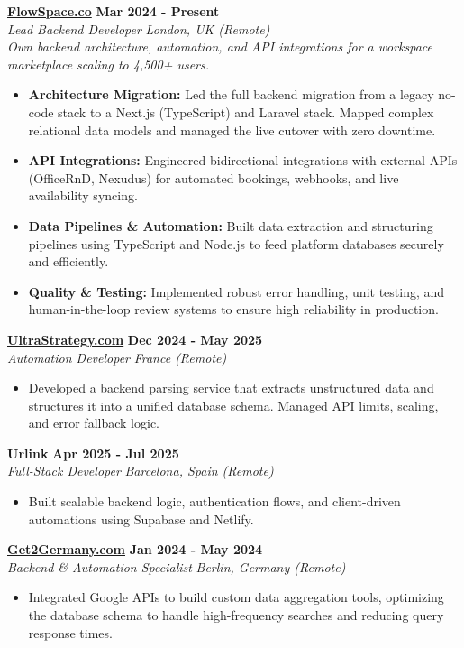 \documentclass[a4paper,10pt]{article}
\newcommand{\role}[4]{%
 \textbf{#1} \hfill \textbf{#2}\\[1pt]%
 \textit{#3} \hfill \textit{#4}\\[2pt]%
}
\begin{document}
\role{\href{https://flowspace.co}{FlowSpace.co}}{Mar 2024 - Present}{Lead Backend Developer}{London, UK (Remote)}
\textit{Own backend architecture, automation, and API integrations for a workspace marketplace scaling to 4,500+ users.}
\begin{itemize}
 \item \textbf{Architecture Migration:} Led the full backend migration from a legacy no-code stack to a Next.js (TypeScript) and Laravel stack. Mapped complex relational data models and managed the live cutover with zero downtime.
 \item \textbf{API Integrations:} Engineered bidirectional integrations with external APIs (OfficeRnD, Nexudus) for automated bookings, webhooks, and live availability syncing.
 \item \textbf{Data Pipelines \& Automation:} Built data extraction and structuring pipelines using TypeScript and Node.js to feed platform databases securely and efficiently.
 \item \textbf{Quality \& Testing:} Implemented robust error handling, unit testing, and human-in-the-loop review systems to ensure high reliability in production.
\end{itemize}

\role{\href{https://ultrastrategy.com}{UltraStrategy.com}}{Dec 2024 - May 2025}{Automation Developer}{France (Remote)}
\begin{itemize}
 \item Developed a backend parsing service that extracts unstructured data and structures it into a unified database schema. Managed API limits, scaling, and error fallback logic.
\end{itemize}

\role{Urlink}{Apr 2025 - Jul 2025}{Full-Stack Developer}{Barcelona, Spain (Remote)}
\begin{itemize}
 \item Built scalable backend logic, authentication flows, and client-driven automations using Supabase and Netlify.
\end{itemize}

\role{\href{https://get2germany.com}{Get2Germany.com}}{Jan 2024 - May 2024}{Backend \& Automation Specialist}{Berlin, Germany (Remote)}
\begin{itemize}
 \item Integrated Google APIs to build custom data aggregation tools, optimizing the database schema to handle high-frequency searches and reducing query response times.
\end{itemize}
\end{document}

